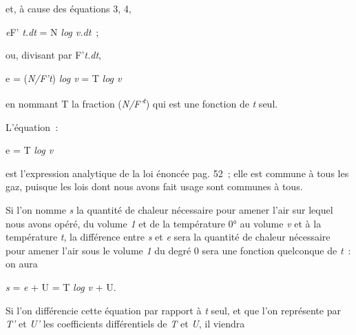 \documentclass[french,twoside]{book} %
\begin{document}
{\begin{center}
\par
\end{center}

 \noindent et, à cause des équations 3, 4,\par
 
\begin{center}
\noindent \emph{e}F’ \emph{t.dt} = N \emph{log v.dt} ;\par
\end{center}

 \noindent ou, divisant par F’\emph{t.dt},\par
 
\begin{center}
\noindent e = (\emph{N/F’t}) \emph{log v} = T \emph{log v}\par
\end{center}

 \noindent en nommant T la fraction (\emph{N/F’\textsuperscript{t}}) qui est une fonction de \emph{t} seul.\par
 L’équation :\par
 
\begin{center}
\noindent e = T \emph{log v}\par
\end{center}

 \noindent est l’expression analytique de la loi énoncée pag. 52 ; elle est commune à tous les gaz, puisque les lois dont nous avons fait usage sont communes à tous.\par
 Si l’on nomme \emph{s} la quantité de chaleur nécessaire pour amener l’air sur lequel nous avons opéré, du volume \emph{1} et de la température 0° au volume \emph{v} et à la température \emph{t}, la différence entre \emph{s} et \emph{e} sera la quantité de chaleur nécessaire pour amener l’air sous le volume \emph{1} du degré 0 sera une fonction quelconque de \emph{t} : on aura\par
 
\begin{center}
\noindent \emph{s} = \emph{e} + U = T \emph{log v} + U.\par
\end{center}

 \noindent Si l’on différencie cette équation par rapport à \emph{t} seul, et que l’on représente par \emph{T’} et \emph{U’} les coefficients différentiels de \emph{T} et \emph{U}, il viendra\par
 
}
\end{document}
